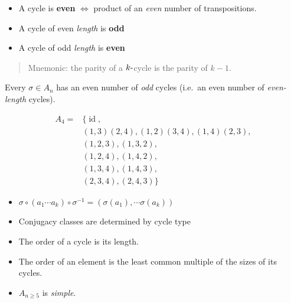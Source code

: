 \begin{definition}

\begin{itemize}
\item
  A cycle is \textbf{even} \(\iff\) product of an \emph{even} number of
  transpositions.
\item
  A cycle of even \emph{length} is \textbf{odd}
\item
  A cycle of odd \emph{length} is \textbf{even}
\end{itemize}

\begin{quote}
Mnemonic: the parity of a \(k{\hbox{-}}\)cycle is the parity of \(k-1\).
\end{quote}

\end{definition}

\begin{corollary}

Every \(\sigma \in A_n\) has an even number of \emph{odd} cycles
(i.e.~an even number of \emph{even-length} cycles).

\end{corollary}

\begin{example}

\begin{align*}
A_4 =
& \{\operatorname{id}, \\
& (1,3)(2,4),
(1,2)(3,4),
(1,4)(2,3), \\
& (1,2,3),
(1,3,2), \\
& (1,2,4),
(1,4,2), \\
& (1,3,4),
(1,4,3), \\
& (2,3,4),
(2,4,3) \}
\end{align*}

\end{example}

\begin{fact}

\envlist

\begin{itemize}
\tightlist
\item
  \(\sigma \circ (a_1 \cdots a_k)\circ \sigma^{-1} = (\sigma(a_1), \cdots \sigma(a_k))\)
\item
  Conjugacy classes are determined by cycle type
\item
  The order of a cycle is its length.
\item
  The order of an element is the least common multiple of the sizes of
  its cycles.
\item
  \(A_{n\geq 5}\) is \emph{simple}.
\end{itemize}

\end{fact}

